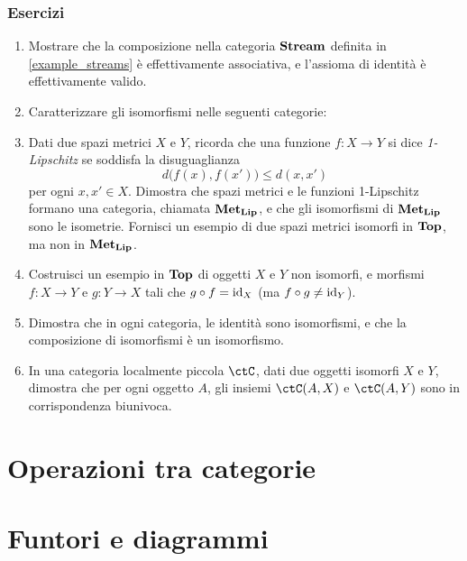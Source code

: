 \subsubsection*{Esercizi}
\begin{enumerate}
    \item Mostrare che la composizione nella categoria $\mathbf{Stream}$ definita in \autoref{example_streams} è effettivamente associativa, e l'assioma di identità è effettivamente valido. %
    \item Caratterizzare gli isomorfismi nelle seguenti categorie: 
    \item Dati due spazi metrici $X$ e $Y$, ricorda che una funzione $f:X\to Y$ si dice \emph{1-Lipschitz} se soddisfa la disuguaglianza
    \[
     d\big( f(x), f(x') \big) \le d(x,x')
    \]
    per ogni $x,x'\in X$. Dimostra che spazi metrici e le funzioni 1-Lipschitz formano una categoria, chiamata $\mathbf{Met}_{\mathbf{Lip}}$, e che gli isomorfismi di $\mathbf{Met}_{\mathbf{Lip}}$ sono le isometrie. Fornisci un esempio di due spazi metrici isomorfi in $\mathbf{Top}$, ma non in $\mathbf{Met}_{\mathbf{Lip}}$.
    \item Costruisci un esempio in $\mathbf{Top}$ di oggetti $X$ e $Y$ non isomorfi, e morfismi $f:X\to Y$ e $g:Y\to X$ tali che $g\circ f=\mathrm{id}_X$ (ma $f\circ g \ne \mathrm{id}_Y$).
    \item Dimostra che in ogni categoria, le identità sono isomorfismi, e che la composizione di isomorfismi è un isomorfismo.
    \item In una categoria localmente piccola $\ctC$, dati due oggetti isomorfi $X$ e $Y$, dimostra che per ogni oggetto $A$, gli insiemi $\Hom{\ctC}(A,X)$ e $\Hom{\ctC}(A,Y)$ sono in corrispondenza biunivoca.
\end{enumerate}
\cippo
\section{Operazioni tra categorie}


\section{Funtori e diagrammi}

